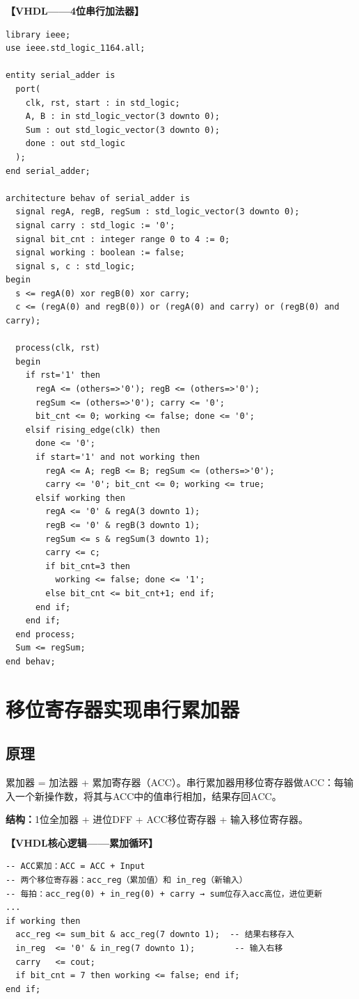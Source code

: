 \textbf{【VHDL——4位串行加法器】}
\begin{lstlisting}
library ieee;
use ieee.std_logic_1164.all;

entity serial_adder is
  port(
    clk, rst, start : in std_logic;
    A, B : in std_logic_vector(3 downto 0);
    Sum : out std_logic_vector(3 downto 0);
    done : out std_logic
  );
end serial_adder;

architecture behav of serial_adder is
  signal regA, regB, regSum : std_logic_vector(3 downto 0);
  signal carry : std_logic := '0';
  signal bit_cnt : integer range 0 to 4 := 0;
  signal working : boolean := false;
  signal s, c : std_logic;
begin
  s <= regA(0) xor regB(0) xor carry;
  c <= (regA(0) and regB(0)) or (regA(0) and carry) or (regB(0) and carry);

  process(clk, rst)
  begin
    if rst='1' then
      regA <= (others=>'0'); regB <= (others=>'0');
      regSum <= (others=>'0'); carry <= '0';
      bit_cnt <= 0; working <= false; done <= '0';
    elsif rising_edge(clk) then
      done <= '0';
      if start='1' and not working then
        regA <= A; regB <= B; regSum <= (others=>'0');
        carry <= '0'; bit_cnt <= 0; working <= true;
      elsif working then
        regA <= '0' & regA(3 downto 1);
        regB <= '0' & regB(3 downto 1);
        regSum <= s & regSum(3 downto 1);
        carry <= c;
        if bit_cnt=3 then
          working <= false; done <= '1';
        else bit_cnt <= bit_cnt+1; end if;
      end if;
    end if;
  end process;
  Sum <= regSum;
end behav;
\end{lstlisting}

\section{移位寄存器实现串行累加器}

\subsection{原理}

累加器 = 加法器 + 累加寄存器（ACC）。串行累加器用移位寄存器做ACC：每输入一个新操作数，将其与ACC中的值串行相加，结果存回ACC。

\textbf{结构：}1位全加器 + 进位DFF + ACC移位寄存器 + 输入移位寄存器。

\textbf{【VHDL核心逻辑——累加循环】}
\begin{lstlisting}
-- ACC累加：ACC = ACC + Input
-- 两个移位寄存器：acc_reg（累加值）和 in_reg（新输入）
-- 每拍：acc_reg(0) + in_reg(0) + carry → sum位存入acc高位，进位更新
...
if working then
  acc_reg <= sum_bit & acc_reg(7 downto 1);  -- 结果右移存入
  in_reg  <= '0' & in_reg(7 downto 1);        -- 输入右移
  carry   <= cout;
  if bit_cnt = 7 then working <= false; end if;
end if;
\end{lstlisting}

